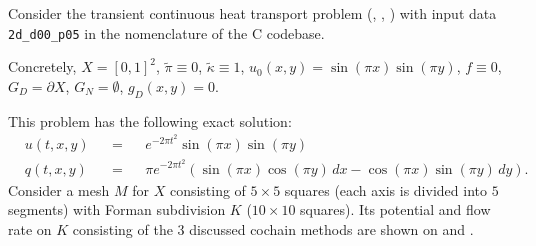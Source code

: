 \begin{example}
  \label{cmc/diffusion/continuous/transient/examples/2d_d00_p05-example}
  Consider the transient continuous heat transport problem
  (,
   ,
   )
  with input data \verb|2d_d00_p05| in the nomenclature of the C codebase.

  Concretely,
    $X = [0, 1]^2$,
    $\tilde{\pi} \equiv 0$,
    $\tilde{\kappa} \equiv 1$,
    $u_0(x, y) = \sin(\pi x) \sin(\pi y)$,
    $f \equiv 0$,
    $G_D = \partial X$,
    $G_N = \emptyset$,
    $g_D(x, y) = 0$.

  This problem has the following exact solution:
  \begin{subequations}
    \begin{alignat}{3}
      & u(t, x, y) && = && e^{-2 \pi t^2} \sin(\pi x) \sin(\pi y) \\
      & q(t, x, y) && =
      && \pi e^{-2 \pi t^2}
         (\sin(\pi x) \cos(\pi y)\, d x - \cos(\pi x) \sin(\pi y)\, d y).
    \end{alignat}
  \end{subequations}
  Consider a mesh $M$ for $X$ consisting of $5 \times 5$ squares (each axis is
  divided into $5$ segments) with Forman subdivision $K$
  ($10 \times 10$ squares).
  Its potential and flow rate on $K$ consisting of the $3$ discussed cochain
  methods are shown on
  and
  .
\end{example}
